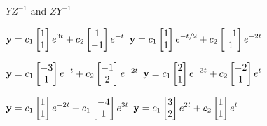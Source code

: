 $YZ^{-1}$  and $ZY^{-1}$


$\mathbf{y}=\displaystyle{c_1\begin{bmatrix}1\\1\end{bmatrix}e^{3t}
+c_2\begin{bmatrix}1\\-1\end{bmatrix}
e^{-t}}$
\quad
{}
 $\mathbf{y}=\displaystyle{c_1\begin{bmatrix}1\\1\end{bmatrix}e^{-t/2}
 +c_2\begin{bmatrix}-1\\1\end{bmatrix}e^{-2t}}$

\smallskip

$\mathbf{y}=\displaystyle{c_1\begin{bmatrix}-3\\1\end{bmatrix}e^{-t}
+c_2\begin{bmatrix}-1\\2\end{bmatrix}e^{-2t}}$
$\mathbf{y}=\displaystyle{c_1\begin{bmatrix}2\\1\end{bmatrix}e^{-3t}
+c_2\begin{bmatrix}-2\\1\end{bmatrix}e^t}$

\smallskip

$\mathbf{y}=\displaystyle{c_1\begin{bmatrix}1\\1\end{bmatrix}e^{-2t}
+c_1\begin{bmatrix}-4\\1\end{bmatrix}e^{3t}}$    \quad
{}
$\mathbf{y}=\displaystyle{c_1\begin{bmatrix}3\\2\end{bmatrix}e^{2t}
+c_2\begin{bmatrix}1\\1\end{bmatrix}e^t}$

\smallskip


